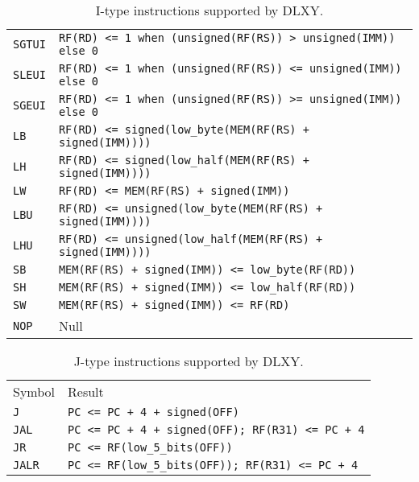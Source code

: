 \begin{table}[H]
\begin{tabular}{ll}
		\rowcolor{gray!25}
		\texttt{SGTUI} & \texttt{RF(RD) <= 1 when (unsigned(RF(RS)) > unsigned(IMM)) else 0} \\
		\texttt{SLEUI} & \texttt{RF(RD) <= 1 when (unsigned(RF(RS)) <= unsigned(IMM)) else 0} \\
		\rowcolor{gray!25}
		\texttt{SGEUI} & \texttt{RF(RD) <= 1 when (unsigned(RF(RS)) >= unsigned(IMM)) else 0} \\
		\texttt{LB} & \texttt{RF(RD) <= signed(low\_byte(MEM(RF(RS) + signed(IMM))))} \\
		\rowcolor{gray!25}
		\texttt{LH} & \texttt{RF(RD) <= signed(low\_half(MEM(RF(RS) + signed(IMM))))} \\
		\texttt{LW} & \texttt{RF(RD) <= MEM(RF(RS) + signed(IMM))} \\
		\rowcolor{gray!25}
		\texttt{LBU} & \texttt{RF(RD) <= unsigned(low\_byte(MEM(RF(RS) + signed(IMM))))} \\
		\texttt{LHU} & \texttt{RF(RD) <= unsigned(low\_half(MEM(RF(RS) + signed(IMM))))} \\
		\rowcolor{gray!25}
		\texttt{SB} & \texttt{MEM(RF(RS) + signed(IMM)) <= low\_byte(RF(RD))} \\
		\texttt{SH} & \texttt{MEM(RF(RS) + signed(IMM)) <= low\_half(RF(RD))} \\
		\rowcolor{gray!25}
		\texttt{SW} & \texttt{MEM(RF(RS) + signed(IMM)) <= RF(RD)} \\
		\texttt{NOP} & Null \\
		\hline
	\end{tabular}
	\caption{I-type instructions supported by DLXY.}
	\label{tab:i_type_inst}
\end{table}

\begin{table}[H]
	\centering
	\begin{tabular}{ll}
		\hline
		\rowcolor{gray!50}
		Symbol & Result \\
		\texttt{J} & \texttt{PC <= PC + 4 + signed(OFF)} \\
		\rowcolor{gray!25}
		\texttt{JAL} & \texttt{PC <= PC + 4 + signed(OFF); RF(R31) <= PC + 4} \\
		\texttt{JR} & \texttt{PC <= RF(low\_5\_bits(OFF))} \\
		\rowcolor{gray!25}
		\texttt{JALR} & \texttt{PC <= RF(low\_5\_bits(OFF)); RF(R31) <= PC + 4} \\
		\hline
	\end{tabular}
	\caption{J-type instructions supported by DLXY.}
	\label{tab:j_type_inst}
\end{table}

